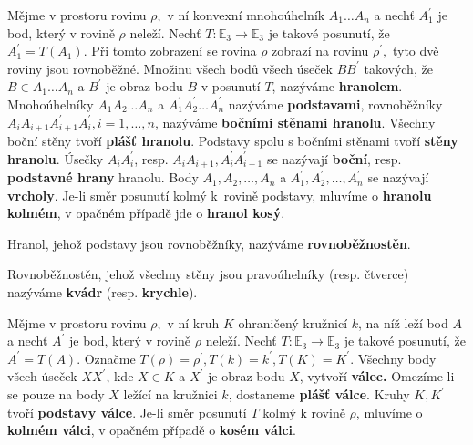 \begin{definition}
    Mějme v prostoru rovinu $\rho,$ v ní konvexní mnohoúhelník $A_1\dots A_n$ a nechť
    $A_1^\prime$ je bod, který v rovině $\rho$ neleží. Nechť $T\colon \mathbb E_3 \to
    \mathbb E_3$ je takové posunutí, že $A_1^\prime=T(A_1).$ Při tomto zobrazení se rovina
    $\rho$ zobrazí na rovinu $\rho^\prime,$ tyto dvě roviny jsou rovnoběžné. Množinu všech bodů všech úseček $BB^\prime$ takových, že $B\in A_1\dots A_n$ a $B^\prime$ je
    obraz bodu $B$ v posunutí $T$, nazýváme \textbf{hranolem}. Mnohoúhelníky
    $A_1A_2\dots A_n$ a $A^\prime_1A^\prime_2\dots A^\prime_n$ nazýváme \textbf{podstavami},
    rovnoběžníky $A_iA_{i+1}A^\prime_{i+1}A_i^\prime, i=1,\dots,n$, nazýváme
    \textbf{bočními stěnami hranolu}. Všechny boční stěny tvoří \textbf{plášť hranolu}.
    Podstavy spolu s bočními stěnami tvoří \textbf{stěny hranolu}. Úsečky $A_iA^\prime_i$,
    resp. $A_iA_{i+1}, A^\prime_iA^\prime_{i+1}$ se nazývají \textbf{boční}, resp. \textbf{podstavné hrany}
    hranolu. Body $A_1,A_2,\dots,A_n$ a $A^\prime_1,A^\prime_2,\dots,A^\prime_n$ se
    nazývají \textbf{vrcholy}. Je-li směr posunutí kolmý k~rovině podstavy, mluvíme
    o \textbf{hranolu kolmém}, v opačném případě jde o \textbf{hranol kosý}.
\end{definition}

\begin{definition}
    Hranol, jehož podstavy jsou rovnoběžníky, nazýváme \textbf{rovnoběžnostěn}.
\end{definition}

\begin{definition}
    Rovnoběžnostěn, jehož všechny stěny jsou pravoúhelníky (resp. čtverce) nazýváme
    \textbf{kvádr} (resp. \textbf{krychle}).
\end{definition}

\begin{definition}
    Mějme v prostoru rovinu $\rho,$ v ní kruh $K$ ohraničený kružnicí $k$, na níž
    leží bod $A$ a nechť
    $A^\prime$ je bod, který v rovině $\rho$ neleží. Nechť $T\colon \mathbb E_3 \to
    \mathbb E_3$ je takové posunutí, že $A^\prime=T(A).$ Označme $T(\rho)=\rho^\prime,
    T(k)=k^\prime, T(K)=K^\prime.$ Všechny body všech úseček $XX^\prime$, kde $X\in K$
    a $X^\prime$ je obraz bodu $X$, vytvoří \textbf{válec.} Omezíme-li se pouze na
    body $X$ ležící na kružnici $k$, dostaneme \textbf{plášť válce}. Kruhy $K,K^\prime$
    tvoří \textbf{podstavy válce}. Je-li směr posunutí $T$ kolmý k rovině $\rho$,
    mluvíme o \textbf{kolmém válci}, v opačném případě o \textbf{kosém válci}.
\end{definition}

